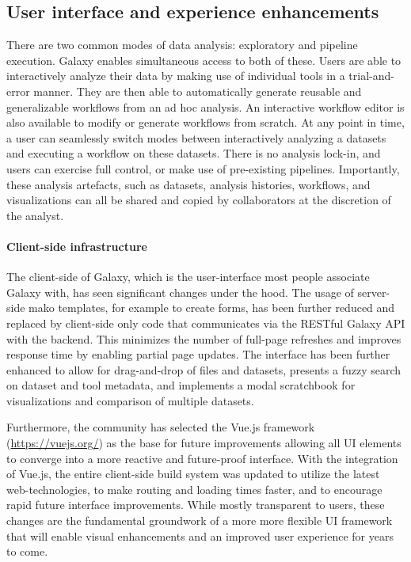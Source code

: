 \subsection*{User interface and experience enhancements}
There are two common modes of data analysis: exploratory and pipeline execution. Galaxy enables simultaneous access to both of these. Users are able to interactively analyze their data by making use of individual tools in a trial-and-error manner. They are then able to automatically generate reusable and generalizable workflows from an ad hoc analysis. An interactive workflow editor is also available to modify or generate workflows from scratch. At any point in time, a user can seamlessly switch modes between interactively analyzing a datasets and executing a workflow on these datasets. There is no analysis lock-in, and users can exercise full control, or make use of pre-existing pipelines. Importantly, these analysis artefacts, such as datasets, analysis histories, workflows, and visualizations can all be shared and copied by collaborators at the discretion of the analyst.

\paragraph*{Client-side infrastructure}
The client-side of Galaxy, which is the user-interface most people associate Galaxy with, has seen significant changes under the hood. The usage of server-side mako templates, for example to create forms, has been further reduced and replaced by client-side only code that communicates via the RESTful Galaxy API with the backend. This minimizes the number of full-page refreshes and improves response time by enabling partial page updates. The interface has been further enhanced to allow for drag-and-drop of files and datasets, presents a fuzzy search on dataset and tool metadata, and implements a modal scratchbook for visualizations and comparison of multiple datasets.

Furthermore, the community has selected the Vue.js framework (\url{https://vuejs.org/}) as the base for future improvements allowing all UI elements to converge into a more reactive and future-proof interface. With the integration of Vue.js, the entire client-side build system was updated to utilize the latest web-technologies, to make routing and loading times faster, and to encourage rapid future interface improvements. While mostly transparent to users, these changes are the fundamental groundwork of a more more flexible UI framework that will enable visual enhancements and an improved user experience for years to come.

